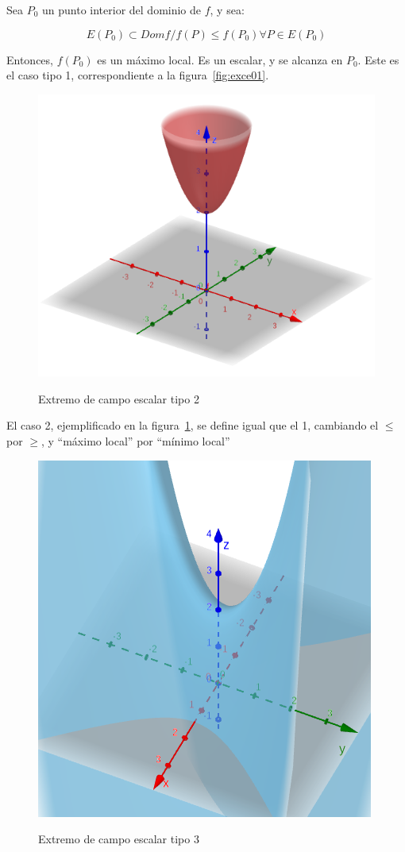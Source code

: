 \documentclass{article}
\begin{document}
Sea $P_0$ un punto interior del dominio de $f$, y sea:

\begin{equation}
E(P_0) \subset Dom f / f(P) \leq f(P_0) \forall P \in E(P_0)
\end{equation}

Entonces, $f(P_0)$ es un máximo local. Es un escalar, y se alcanza en $P_0$. Este es el caso tipo 1, correspondiente a la figura~\ref{fig:exce01}. 

\begin{figure}[ht]
\caption{Extremo de campo escalar tipo 2}
\includegraphics[scale=0.6]{img/teo_fig016_exce02.png} 
\centering
\label{fig:exce02}
\end{figure}

El caso 2, ejemplificado en la figura~\ref{fig:exce02}, se define igual que el 1, cambiando el $\leq$ por $\geq$, y ``máximo local'' por ``mínimo local''

\begin{figure}[ht]
\caption{Extremo de campo escalar tipo 3}
\includegraphics[scale=0.6]{img/teo_fig017_exce03.png} 
\centering
\label{fig:exce03}
\end{figure}
\end{document}
